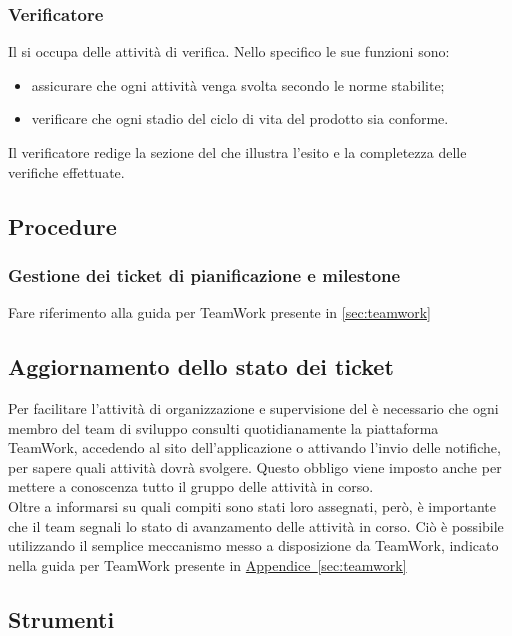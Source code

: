		\subsubsection{Verificatore}
			Il  si occupa delle attività di verifica. Nello specifico le sue funzioni sono:
			\begin{itemize}
				\item assicurare che ogni attività venga svolta secondo le norme stabilite;
				\item verificare che ogni stadio del ciclo di vita del prodotto sia conforme.
			\end{itemize}
			Il verificatore redige la sezione del  che illustra l’esito e la completezza delle verifiche effettuate.
			\subsection{Procedure}
				\subsubsection{Gestione dei ticket di pianificazione e milestone}
					Fare riferimento alla guida per TeamWork presente in \autoref{sec:teamwork}
				\subsection{Aggiornamento dello stato dei ticket} \label{subsec:aggiornamentoStatoTicket}
	Per facilitare l'attività di organizzazione e supervisione del  è necessario che ogni membro del team di sviluppo consulti quotidianamente la piattaforma TeamWork, accedendo al sito dell'applicazione o attivando l'invio delle notifiche, per sapere quali attività dovrà svolgere. Questo obbligo viene imposto anche per mettere a conoscenza tutto il gruppo delle attività in corso.\\
	Oltre a informarsi su quali compiti sono stati loro assegnati, però, è importante che il team segnali lo stato di avanzamento delle attività in corso. Ciò è possibile utilizzando il semplice meccanismo messo a disposizione da TeamWork, indicato nella guida per TeamWork presente in \hyperref[sec:teamwork]{Appendice~\ref*{sec:teamwork}}
			\subsection{Strumenti}
